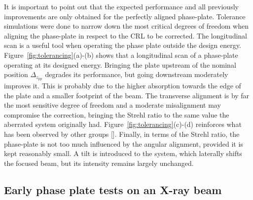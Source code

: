 \begin{refsection}
It is important to point out that the expected performance and all previously improvements are only obtained for the perfectly aligned phase-plate. Tolerance simulations were done to narrow down the most critical degrees of freedom when aligning the phase-plate in respect to the CRL to be corrected. The longitudinal scan is a useful tool when operating the phase plate outside the design energy. Figure~\ref{fig:tolerancing}(a)-(b) shows that a longitudinal scan of a phase-plate operating at its designed energy. Bringing the plate upstream of the nominal position $\Delta_{z_\text{pp}}$ degrades its performance, but going downstream moderately improves it. This is probably due to the higher absorption towards the edge of the plate and a smaller footprint of the beam. The transverse alignment is by far the most sensitive degree of freedom and a moderate misalignment may compromise the correction, bringing the Strehl ratio to the same value the aberrated system originally had. Figure~\ref{fig:tolerancing}(c)-(d) reinforces what has been observed by other groups [\cite[Fig.~5.12]{Seiboth2016b}]. Finally, in terms of the Strehl ratio, the phase-plate is not too much influenced by the angular alignment, provided it is kept reasonably small. A tilt is introduced to the system, which laterally shifts the focused beam, but its intensity remains largely unchanged.

\subsection{Early phase plate tests on an X-ray beam}


\end{refsection}
